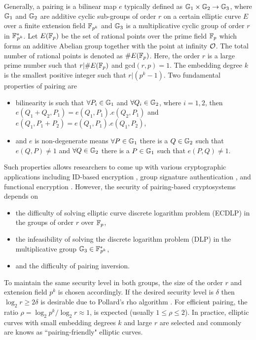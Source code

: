 Generally, a pairing is a bilinear map $e$ typically defined as  ${\mathbb{G}}_{1} \times {\mathbb{G}}_{2} \to {\mathbb{G}}_{3}$, where ${\mathbb{G}}_{1}$ and ${\mathbb{G}}_{2}$ are additive cyclic sub-groups of  order $r$  on a certain elliptic curve $E$ over a finite extension field $\mathbb{F}_{p^k}$ and ${\mathbb{G}}_{3}$ is a multiplicative cyclic group of order $r$ in ${{\mathbb{F}}^{\ast}}_{\!\!\!p^{k}}$.
Let $E({\mathbb{F}}_{p})$ be the set of rational points over the prime field ${\mathbb{F}}_{p}$ which forms an additive Abelian group together with the point at infinity $\cal{O}$. The total number of rational points is denoted as $\#E({\mathbb{F}}_{p})$. Here, the order $r$ is a large prime number such that $r | \#E({\mathbb{F}}_{p})$ and gcd$(r,p)=1$. The embedding degree $k$ is the smallest positive integer such that $r | (p^k -1)$.
Two fundamental properties of pairing are
\begin{itemize}
	\item bilinearity is such that $\forall P_i \in {\mathbb{G}}_{1}$ and $\forall Q_i \in {\mathbb{G}}_{2}$, where $i= 1, 2$, then $e(Q_1+Q_2,P_1) = e(Q_1,P_1). e(Q_2,P_1)$ and $e(Q_1,P_1+P_2) = e(Q_1,P_1). e(Q_1,P_2)$,
	\item and $e$ is non-degenerate means $\forall P \in {\mathbb{G}}_{1}$ there is a $Q \in {\mathbb{G}}_{2}$ such that  $e(Q,P) \neq 1$ and $\forall Q \in {\mathbb{G}}_{2}$ there is a $P \in {\mathbb{G}}_{1}$ such that $e(P,Q) \neq 1$.
\end{itemize}
Such properties allows researchers to come up with various cryptographic applications including ID-based encryption \cite{C:BonFra01}, group signature authentication \cite{C:BonBoySha04}, and functional encryption \cite{C:OkaTak10}.  However, the security of pairing-based cryptosystems depends  on 
\begin{itemize}
	\item  the difficulty of solving elliptic curve discrete logarithm problem (ECDLP) in the groups of order $r$ over ${\mathbb{F}}_{p}$,
	\item  the infeasibility of solving the discrete logarithm problem (DLP) in the multiplicative group ${\mathbb{G}}_{3} \in {{\mathbb{F}}^{\ast}}_{\!\!\!p^{k}}$,
	\item and the difficulty of pairing inversion.
\end{itemize}
To maintain the same security level in both groups, the size of the order $r$ and extension field $p^k$ is chosen accordingly. If the desired security level is $\delta$ then $\log_2 r  \geq 2\delta$ is desirable due to Pollard's rho algorithm \cite{1978-pollard-kangaroo}.  For efficient pairing, the ratio $\rho = \log_2 p^k/ \log_2 r \approx 1$,   is expected (usually  $1\leq  \rho  \leq 2$). In practice, elliptic curves with small embedding degrees $k$ and large $r$ are selected and commonly are knows as ``pairing-friendly" elliptic curves.

